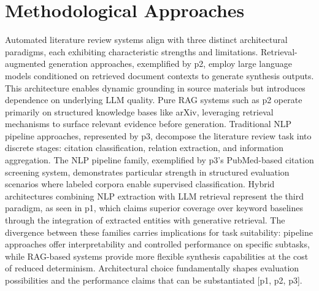 \documentclass{article}
\begin{document}
\section{Methodological Approaches}
Automated literature review systems align with three distinct architectural paradigms, each exhibiting characteristic strengths and limitations. Retrieval-augmented generation approaches, exemplified by p2, employ large language models conditioned on retrieved document contexts to generate synthesis outputs. This architecture enables dynamic grounding in source materials but introduces dependence on underlying LLM quality. Pure RAG systems such as p2 operate primarily on structured knowledge bases like arXiv, leveraging retrieval mechanisms to surface relevant evidence before generation. Traditional NLP pipeline approaches, represented by p3, decompose the literature review task into discrete stages: citation classification, relation extraction, and information aggregation. The NLP pipeline family, exemplified by p3's PubMed-based citation screening system, demonstrates particular strength in structured evaluation scenarios where labeled corpora enable supervised classification. Hybrid architectures combining NLP extraction with LLM retrieval represent the third paradigm, as seen in p1, which claims superior coverage over keyword baselines through the integration of extracted entities with generative retrieval. The divergence between these families carries implications for task suitability: pipeline approaches offer interpretability and controlled performance on specific subtasks, while RAG-based systems provide more flexible synthesis capabilities at the cost of reduced determinism. Architectural choice fundamentally shapes evaluation possibilities and the performance claims that can be substantiated [p1, p2, p3].
\end{document}
